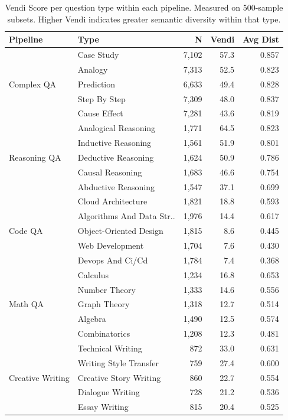 \begin{table}[t]
\centering
\caption{Vendi Score per question type within each pipeline. Measured on 500-sample subsets. Higher Vendi indicates greater semantic diversity within that type.}
\label{tab:per_type_vendi}
\small
\begin{tabular}{llrrr}
\toprule
\textbf{Pipeline} & \textbf{Type} & \textbf{N} & \textbf{Vendi} & \textbf{Avg Dist} \\
\midrule
\multirow{5}{*}{Complex QA} & Case Study & 7,102 & 57.3 & 0.857 \\
 & Analogy & 7,313 & 52.5 & 0.823 \\
 & Prediction & 6,633 & 49.4 & 0.828 \\
 & Step By Step & 7,309 & 48.0 & 0.837 \\
 & Cause Effect & 7,281 & 43.6 & 0.819 \\
\midrule
\multirow{5}{*}{Reasoning QA} & Analogical Reasoning & 1,771 & 64.5 & 0.823 \\
 & Inductive Reasoning & 1,561 & 51.9 & 0.801 \\
 & Deductive Reasoning & 1,624 & 50.9 & 0.786 \\
 & Causal Reasoning & 1,683 & 46.6 & 0.754 \\
 & Abductive Reasoning & 1,547 & 37.1 & 0.699 \\
\midrule
\multirow{5}{*}{Code QA} & Cloud Architecture & 1,821 & 18.8 & 0.593 \\
 & Algorithms And Data Str.. & 1,976 & 14.4 & 0.617 \\
 & Object-Oriented Design & 1,815 & 8.6 & 0.445 \\
 & Web Development & 1,704 & 7.6 & 0.430 \\
 & Devops And Ci/Cd & 1,784 & 7.4 & 0.368 \\
\midrule
\multirow{5}{*}{Math QA} & Calculus & 1,234 & 16.8 & 0.653 \\
 & Number Theory & 1,333 & 14.6 & 0.556 \\
 & Graph Theory & 1,318 & 12.7 & 0.514 \\
 & Algebra & 1,490 & 12.5 & 0.574 \\
 & Combinatorics & 1,208 & 12.3 & 0.481 \\
\midrule
\multirow{5}{*}{Creative Writing} & Technical Writing & 872 & 33.0 & 0.631 \\
 & Writing Style Transfer & 759 & 27.4 & 0.600 \\
 & Creative Story Writing & 860 & 22.7 & 0.554 \\
 & Dialogue Writing & 728 & 21.2 & 0.536 \\
 & Essay Writing & 815 & 20.4 & 0.525 \\
\bottomrule
\end{tabular}
\end{table}